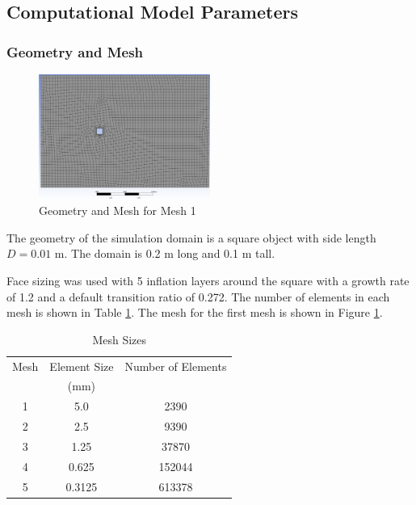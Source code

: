 \subsection{Computational Model Parameters}
\subsubsection{Geometry and Mesh}
\begin{figure}[H]
    \centering
    \includegraphics[width=0.5\textwidth]{Questions/Figures/grid 1 mesh.png}
    \caption{Geometry and Mesh for Mesh 1}
    \label{fig:mesh1}
\end{figure}
The geometry of the simulation domain is a square object with side length $D = 0.01$ m. The domain is 0.2 m long and 0.1 m tall. 

Face sizing was used with 5 inflation layers around the square with a growth rate of 1.2 and a default transition ratio of 0.272. The number of elements in each mesh is shown in Table \ref{tab:mesh_sizes}. The mesh for the first mesh is shown in Figure \ref{fig:mesh1}. 
\begin{table}[H]
    \centering
    \caption{Mesh Sizes}
    \label{tab:mesh_sizes}
    \begin{tabular}{ccc}
        \toprule
        Mesh & Element Size & Number of Elements \\
        & (mm) & \\
        \midrule
        1 & 5.0 & 2390 \\
        2 & 2.5 & 9390 \\
        3 & 1.25 & 37870 \\
        4 & 0.625 & 152044 \\
        5 & 0.3125 & 613378 \\
        \bottomrule
    \end{tabular}
\end{table}


